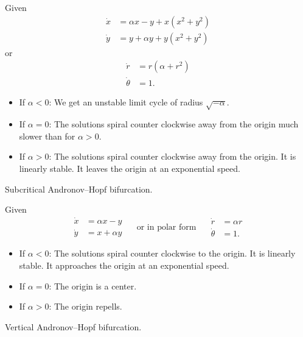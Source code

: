 \documentclass{article}
\begin{document}
\begin{exam}
    Given
    $$\begin{aligned}
        \dot x &= \alpha x-y+x(x^2+y^2)\\
        \dot y &= y + \alpha y + y(x^2+y^2)
    \end{aligned}$$
    or
    $$\begin{aligned}
        \dot r &= r(\alpha + r^2)\\
        \dot \theta &= 1.
    \end{aligned}$$
    \begin{itemize}
        \item If $\alpha < 0$: We get an unstable limit cycle of radius $\sqrt{-\alpha}$.

        \item If $\alpha = 0$: The solutions spiral counter clockwise away from the origin much slower than for $\alpha>0$.

        \item If $\alpha > 0$: The solutions spiral counter clockwise away from the origin. It is linearly stable. It leaves the origin at an exponential speed.
    \end{itemize}
    Subcritical Andronov--Hopf bifurcation.
\end{exam}

\begin{exam}
    Given
    $$\begin{aligned}
        \dot x &= \alpha x - y\\
        \dot y &= x+\alpha y
    \end{aligned} \quad\text{ or in polar form }\quad\begin{aligned}
        \dot r &= \alpha r\\
        \dot \theta &= 1.
    \end{aligned}$$
    \begin{itemize}
        \item If $\alpha < 0$: The solutions spiral counter clockwise to the origin. It is linearly stable. It approaches the origin at an exponential speed.

        \item If $\alpha = 0$: The origin is a center.

        \item If $\alpha > 0$: The origin repells.
    \end{itemize}
    Vertical Andronov--Hopf bifurcation.
\end{exam}
\end{document}
